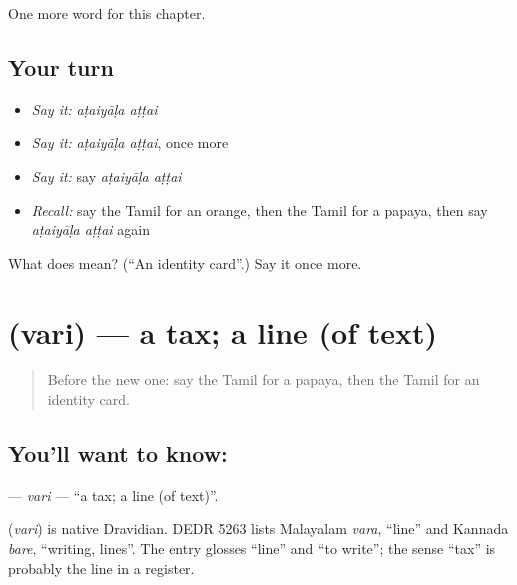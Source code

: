 \begin{grammarlens}[title={What you've built}]
One more word for this chapter.
\end{grammarlens}

\subsection*{Your turn}
\begin{itemize}
\raggedright
  \item \emph{Say it:} \emph{aṭaiyāḷa aṭṭai}
  \item \emph{Say it:} \emph{aṭaiyāḷa aṭṭai}, once more
  \item \emph{Say it:} say \emph{aṭaiyāḷa aṭṭai}
  \item \emph{Recall:} say the Tamil for an orange, then the Tamil for a papaya, then say \emph{aṭaiyāḷa aṭṭai} again
\end{itemize}

\begin{tcolorbox}[breakable,colback=teal!4,colframe=teal!35!black,title={Before you move on}]
What does   mean? (\textquotedblleft{}An identity card\textquotedblright{}.) Say it once more.
\end{tcolorbox}
\section[\texorpdfstring{\ta{வரி} (vari)}{வரி (vari)}]{ (vari) — a tax; a line (of text)}

\label{lesson:TA-C272-vari}



\begin{quote}
Before the new one: say the Tamil for a papaya, then the Tamil for an identity card.
\end{quote}

\subsection*{You'll want to know: }
\textbf{} — \emph{vari} — \textquotedblleft{}a tax; a line (of text)\textquotedblright{}.

\begin{cousinweb}
\textbf{} (\emph{vari}) is native Dravidian. DEDR 5263 lists Malayalam \emph{vara}, \textquotedblleft{}line\textquotedblright{} and Kannada \emph{bare}, \textquotedblleft{}writing, lines\textquotedblright{}. The entry glosses \textquotedblleft{}line\textquotedblright{} and \textquotedblleft{}to write\textquotedblright{}; the sense \textquotedblleft{}tax\textquotedblright{} is probably the line in a register.
\end{cousinweb}

